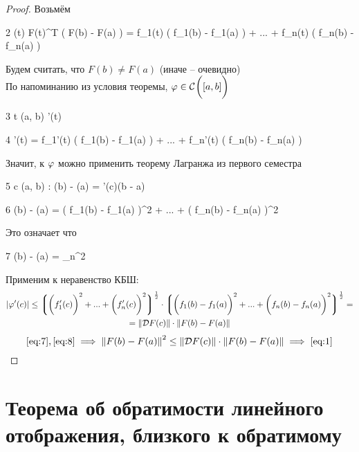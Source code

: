 \begin{proof}
	Возьмём
	\begin{equ}2
		\vphi(t)  F(t)^T \bigg( F(b) - F(a) \bigg) = f_1(t) \bigg( f_1(b) - f_1(a) \bigg) + ... + f_n(t) \bigg( f_n(b) - f_n(a) \bigg)
	\end{equ}
	Будем считать, что $ F(b) \ne F(a) $ (иначе -- очевидно) \\
	По напоминанию из условия теоремы, $ \varphi \in \mathcal{C}^{} \bigg( {[a, b]} \bigg)  $
	\begin{equ}3
		\forall t \in (a, b) \quad \exist \vphi'(t)
	\end{equ}
	\begin{equ}4
		\vphi'(t) = f_1'(t) \bigg( f_1(b) - f_1(a) \bigg) + ... + f_n'(t) \bigg( f_n(b) - f_n(a) \bigg)
	\end{equ}
	Значит, к $ \varphi $ можно применить теорему Лагранжа из первого семестра
	\begin{equ}5
		\exist c \in (a, b) : \vphi(b) - \vphi(a) = \vphi'(c)(b - a)
	\end{equ}
	\begin{equ}6
		 \implies \vphi(b) - \vphi(a) = \bigg( f_1(b) - f_1(a) \bigg)^2 + ... + \bigg( f_n(b) - f_n(a) \bigg)^2
	\end{equ}
	Это означает что
	\begin{equ}7
		\vphi(b) - \vphi(a) = \norm{F(b) - F(a)}_n^2
	\end{equ}
	Применим к  неравенство КБШ:
	\begin{multline}\lbl8
		|\vphi'(c)| \le \bigg\lgroup \bigg( f_1'(c) \bigg)^2 + ... + \bigg(f_n'(c) \bigg)^2 \bigg\rgroup^\frac12 \cdot \bigg\lgroup \bigg( f_1(b) - f_1(a) \bigg)^2 + ... + \bigg( f_n(b) - f_n(a) \bigg)^2 \bigg\rgroup^\frac12 = \\
		= \norm{\mc{D}F(c)} \cdot {}
	\end{multline}
	$$ \eref7, \eref8 \implies \norm{F(b) - F(a)}^2 \le \norm{\mc{D}F(c)} \cdot \norm{F(b) - F(a)} \implies \eref1 $$
\end{proof}

\section{Теорема об обратимости линейного отображения, близкого к обратимому}

